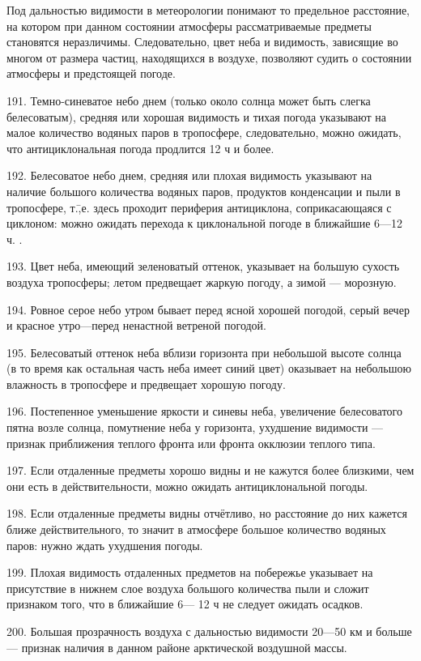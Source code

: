 Под дальностью видимости в метеорологии понимают то предельное расстояние, на котором при данном состоянии атмосферы рассматриваемые предметы становятся неразличимы. Следовательно, цвет неба и видимость, зависящие во многом от размера частиц, находящихся в воздухе, позволяют судить о состоянии атмосферы и предстоящей погоде.

191. Темно-синеватое небо днем (только около солнца может быть слегка белесоватым), средняя или хорошая видимость и тихая погода указывают на малое количество водяных паров в тропосфере, следовательно, можно ожидать, что антициклональная погода продлится 12 ч и более.

192. Белесоватое небо днем, средняя или плохая видимость указывают на наличие большого количества водяных паров, продуктов конденсации и пыли в тропосфере, т.\=,е. здесь проходит периферия антициклона, соприкасающаяся с циклоном: можно ожидать перехода к циклональной погоде в ближайшие 6—12 ч. .

193. Цвет неба, имеющий зеленоватый оттенок, указывает на большую сухость воздуха тропосферы; летом предвещает жаркую погоду, а зимой — морозную.

194. Ровное серое небо утром бывает перед ясной хорошей погодой, серый вечер и красное утро—перед ненастной ветреной погодой.

195. Белесоватый оттенок неба вблизи горизонта при небольшой высоте солнца (в то время как остальная часть неба имеет синий цвет) оказывает на небольшою влажность в тропосфере и предвещает хорошую погоду.

196. Постепенное уменьшение яркости и синевы неба, увеличение белесоватого пятна возле солнца, помутнение неба у горизонта, ухудшение видимости — признак приближения теплого фронта или фронта окклюзии теплого типа.

197. Если отдаленные предметы хорошо видны и не кажутся более близкими, чем они есть в действительности, можно ожидать антициклональной погоды.

198. Если отдаленные предметы видны отчётливо, но расстояние до них кажется ближе действительного, то значит в атмосфере большое количество водяных паров: нужно ждать ухудшения погоды.

199. Плохая видимость отдаленных предметов на побережье указывает на присутствие в нижнем слое воздуха большого количества пыли и сложит признаком того, что в ближайшие 6— 12 ч не следует ожидать осадков.

200. Большая прозрачность воздуха с дальностью видимости 20—50 км и больше — признак наличия в данном районе арктической воздушной массы.

